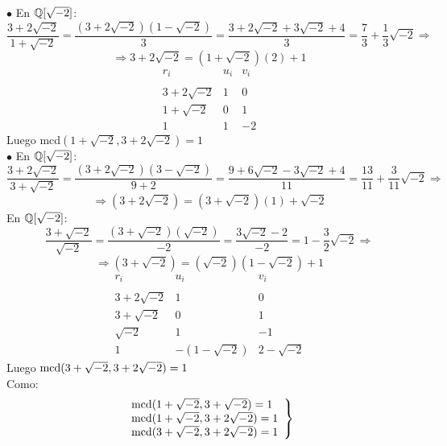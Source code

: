 \documentclass[12pt]{article}
\begin{document}
\begin{ejercicio}[2.5 puntos]
        \noindent
        $\bullet$ En $\mathbb{Q}[\sqrt{-2}]$:
        $$\dfrac{3+2\sqrt{-2}}{1+\sqrt{-2}} = \dfrac{(3+2\sqrt{-2})(1-\sqrt{-2})}{3} = \dfrac{3+2\sqrt{-2}+3\sqrt{-2}+4}{3} = \dfrac{7}{3} + \dfrac{1}{3}\sqrt{-2} \Rightarrow$$
        $$\Rightarrow 3+2\sqrt{-2} = (1+\sqrt{-2})(2)+1$$
        \begin{equation*}
        \begin{array}{rcr}
            r_i & u_i & v_i \\ \\
            3+2\sqrt{-2} & 1 & 0 \\
            1+\sqrt{-2} & 0 & 1 \\
            1 & 1 & -2
        \end{array}
        \end{equation*}
        Luego mcd$(1+\sqrt{-2}, 3+2\sqrt{-2}) = 1$\\

        \noindent
        $\bullet$ En $\mathbb{Q}[\sqrt{-2}]$:
        $$\dfrac{3+2\sqrt{-2}}{3+\sqrt{-2}} = \dfrac{(3+2\sqrt{-2})(3-\sqrt{-2})}{9+2} = \dfrac{9+6\sqrt{-2}-3\sqrt{-2}+4}{11} = \dfrac{13}{11}+\dfrac{3}{11}\sqrt{-2} \Rightarrow$$
        $$\Rightarrow (3+2\sqrt{-2})=(3+\sqrt{-2})(1)+\sqrt{-2}$$
        En $\mathbb{Q}[\sqrt{-2}]$:
        $$\dfrac{3+\sqrt{-2}}{\sqrt{-2}} = \dfrac{(3+\sqrt{-2})(\sqrt{-2})}{-2} = \dfrac{3\sqrt{-2}-2}{-2} = 1-\dfrac{3}{2}\sqrt{-2} \Rightarrow$$
        $$\Rightarrow (3+\sqrt{-2})=(\sqrt{-2})(1-\sqrt{-2})+1$$
        \begin{equation*}
        \begin{array}{rcl}
            r_i & u_i & v_i \\ \\
            3+2\sqrt{-2} & 1 & 0 \\
            3+\sqrt{-2} & 0 & 1 \\
            \sqrt{-2} & 1 & -1 \\
            1 & -(1-\sqrt{-2}) & 2-\sqrt{-2}
        \end{array}
        \end{equation*}
        Luego $\operatorname{mcd}(3+\sqrt{-2}, 3+2\sqrt{-2}) = 1$\\

        \noindent
        Como:
        \begin{equation*}
            \left.\begin{array}{l}
                \operatorname{mcd}(1+\sqrt{-2}, 3+\sqrt{-2}) = 1 \\
                \operatorname{mcd}(1+\sqrt{-2}, 3+2\sqrt{-2}) = 1\\
                \operatorname{mcd}(3+\sqrt{-2}, 3+2\sqrt{-2}) = 1
            \end{array}\right\}
        \end{equation*}


\end{ejercicio}
\end{document}
